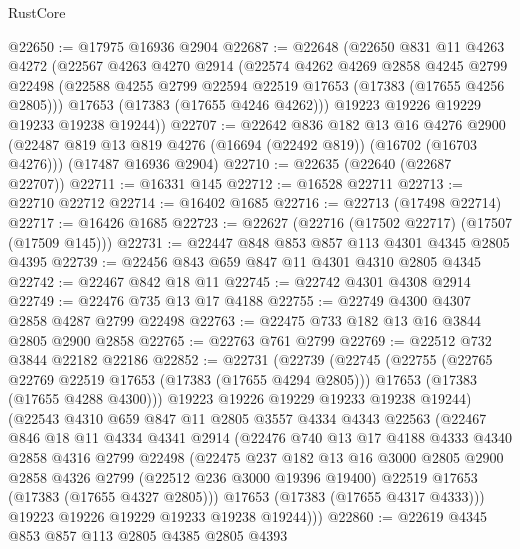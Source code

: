 \begin{lexlean}{RustCore}
\begin{coremodule}
@22650 := @17975 @16936 @2904
@22687 := @22648
    (@22650
      @831
      @11
      @4263
      @4272
      (@22567
        @4263
        @4270
        @2914
        (@22574
          @4262
          @4269
          @2858
          @4245
          @2799
          @22498
          (@22588 @4255 @2799 @22594 @22519 @17653 (@17383 (@17655 @4256 @2805)))
          @17653
          (@17383 (@17655 @4246 @4262)))
        @19223
        @19226
        @19229
        @19233
        @19238
        @19244))
@22707 := @22642
    @836
    @182
    @13
    @16
    @4276
    @2900
    (@22487 @819 @13 @819 @4276 (@16694 (@22492 @819)) (@16702 (@16703 @4276)))
    (@17487 @16936 @2904)
@22710 := @22635 (@22640 (@22687 @22707))
@22711 := @16331 @145
@22712 := @16528 @22711
@22713 := @22710 @22712
@22714 := @16402 @1685
@22716 := @22713 (@17498 @22714)
@22717 := @16426 @1685
@22723 := @22627 (@22716 (@17502 @22717) (@17507 (@17509 @145)))
@22731 := @22447 @848 @853 @857 @113 @4301 @4345 @2805 @4395
@22739 := @22456 @843 @659 @847 @11 @4301 @4310 @2805 @4345
@22742 := @22467 @842 @18 @11
@22745 := @22742 @4301 @4308 @2914
@22749 := @22476 @735 @13 @17 @4188
@22755 := @22749 @4300 @4307 @2858 @4287 @2799 @22498
@22763 := @22475 @733 @182 @13 @16 @3844 @2805 @2900 @2858
@22765 := @22763 @761 @2799
@22769 := @22512 @732 @3844 @22182 @22186
@22852 := @22731
    (@22739
      (@22745
        (@22755
          (@22765 @22769 @22519 @17653 (@17383 (@17655 @4294 @2805)))
          @17653
          (@17383 (@17655 @4288 @4300)))
        @19223
        @19226
        @19229
        @19233
        @19238
        @19244)
      (@22543
        @4310
        @659
        @847
        @11
        @2805
        @3557
        @4334
        @4343
        @22563
        (@22467
          @846
          @18
          @11
          @4334
          @4341
          @2914
          (@22476
            @740
            @13
            @17
            @4188
            @4333
            @4340
            @2858
            @4316
            @2799
            @22498
            (@22475
              @237
              @182
              @13
              @16
              @3000
              @2805
              @2900
              @2858
              @4326
              @2799
              (@22512 @236 @3000 @19396 @19400)
              @22519
              @17653
              (@17383 (@17655 @4327 @2805)))
            @17653
            (@17383 (@17655 @4317 @4333)))
          @19223
          @19226
          @19229
          @19233
          @19238
          @19244)))
@22860 := @22619 @4345 @853 @857 @113 @2805 @4385 @2805 @4393

\end{coremodule}
\end{lexlean}
